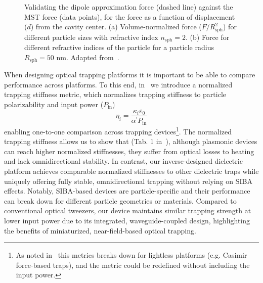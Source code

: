 \begin{figure}[tb]
    \centering
    \caption{Validating the dipole approximation force (dashed line) against the MST force (data points), for the force as a function of displacement ($d$) from the cavity center.
    (a) Volume-normalized force ($F/R^2_\text{sph}$) for different particle sizes with refractive index $n_\text{sph}=2$. (b) Force for different refractive indices of the particle for a particle radius $R_\text{sph}=50$ nm. Adapted from~\cite{ownpub3}.}
    \label{fig:SPIE}
\end{figure}

When designing optical trapping platforms it is important to be able to compare performance across platforms. To this end, in~\cite{ownpub3} we introduce a normalized
trapping stiffness metric, which normalizes trapping stiffness to particle  polarizability and input power ($P_\text{in}$)
\begin{equation}
    \eta_i=\frac{\kappa_i \varepsilon_0}{\alpha^\prime P_{\text{in}}}
\end{equation}
enabling one-to-one comparison across trapping devices\footnote{As noted in~\cite{ownpub3} this metrics breaks down for lightless platforms (e.g. Casimir force-based traps), and the metric could be redefined
without including the input power.}. The normalized trapping stiffness allows us to show that (Tab. 1 in~\cite{ownpub3}), although plasmonic devices can reach higher normalized 
stiffnesses, they suffer from optical losses to heating and lack omnidirectional stability. In contrast, our inverse-designed dielectric platform
 achieves comparable normalized stiffnesses to other dielectric traps while uniquely offering fully stable, omnidirectional trapping
  without relying on SIBA effects. Notably, SIBA-based devices are particle-specific and their performance can break down
   for different particle geometries or materials. Compared to conventional optical tweezers, our device maintains similar trapping
    strength at lower input power due to its integrated, waveguide-coupled design, highlighting the benefits of miniaturized,
     near-field-based optical trapping.

